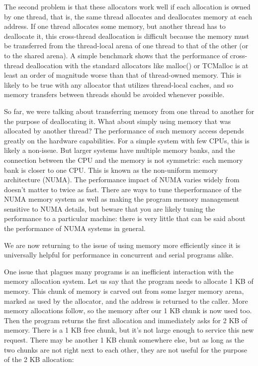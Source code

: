 The second problem is that these allocators work well if each allocation is owned by one thread, that is, the same thread allocates and deallocates memory at each address. If one thread allocates some memory, but another thread has to deallocate it, this cross-thread deallocation is difficult because the memory must be transferred from the thread-local arena of one thread to that of the other (or to the shared arena). A simple benchmark shows that the performance of cross-thread deallocation with the standard allocators like malloc() or TCMalloc is at least an order of magnitude worse than that of thread-owned memory. This is likely to be true with any allocator that utilizes thread-local caches, and so memory transfers between threads should be avoided whenever possible.

So far, we were talking about transferring memory from one thread to another for the purpose of deallocating it. What about simply using memory that was allocated by another thread? The performance of such memory access depends greatly on the hardware capabilities. For a simple system with few CPUs, this is likely a non-issue. But larger systems have multiple memory banks, and the connection between the CPU and the memory is not symmetric: each memory bank is closer to one CPU. This is known as the non-uniform memory architecture (NUMA). The performance impact of NUMA varies widely from doesn’t matter to twice as fast. There are ways to tune theperformance of the NUMA memory system as well as making the program memory management sensitive to NUMA details, but beware that you are likely tuning the performance to a particular machine: there is very little that can be said about the performance of NUMA systems in general.

We are now returning to the issue of using memory more efficiently since it is universally helpful for performance in concurrent and serial programs alike.



One issue that plagues many programs is an inefficient interaction with the memory allocation system. Let us say that the program needs to allocate 1 KB of memory. This chunk of memory is carved out from some larger memory arena, marked as used by the allocator, and the address is returned to the caller. More memory allocations follow, so the memory after our 1 KB chunk is now used too. Then the program returns the first allocation and immediately asks for 2 KB of memory. There is a 1 KB free chunk, but it’s not large enough to service this new request. There may be another 1 KB chunk somewhere else, but as long as the two chunks are not right next to each other, they are not useful for the purpose of the 2 KB allocation:

